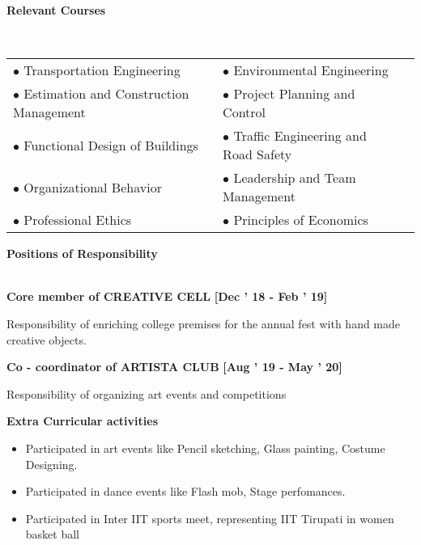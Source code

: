 \documentclass[a4paper,10pt]{article}
\begin{document}
\colorbox{titleColor}{\parbox{6.7in}{\textbf{Relevant Courses}}}\\[0.08in]
    \begin{tabular}{p{3.5in}p{3in}p{2.5in}}
\hspace{0.9pc}$\bullet$ Transportation Engineering&$\bullet$ Environmental Engineering\\[0.05in]
\hspace{0.9pc}$\bullet$ Estimation and Construction Management&$\bullet$ Project Planning and Control\\[0.05in]
\hspace{0.9pc}$\bullet$ Functional Design of Buildings&$\bullet$ Traffic Engineering and Road Safety\\[0.05in]
\hspace{0.9pc}$\bullet$ Organizational Behavior&$\bullet$ Leadership and Team Management\\[0.05in]
\hspace{0.9pc}$\bullet$ Professional Ethics&$\bullet$ Principles of Economics\\[0.05in]
\end{tabular}


\colorbox{titleColor}{\parbox{6.7in}{\textbf{Positions of Responsibility}}}\\

\textbf{Core member of CREATIVE CELL}  \hfill {\small{{\textbf{[Dec ’ 18 - Feb ’ 19]}}}\/} 
\begin{itemize*} 

        \item Responsibility of enriching college premises for the annual fest with hand made creative objects. 

        \end{itemize*}

\textbf{Co - coordinator of ARTISTA CLUB}  \hfill {\small{{\textbf{[Aug ’ 19 - May ’ 20]}}}\/} 
\begin{itemize*} 

        \item Responsibility of organizing art events and competitions 

        \end{itemize*}

\colorbox{titleColor}{\parbox{6.7in}{\textbf{Extra Curricular activities}}}

\begin{itemize}

    \setlength{\itemsep}{1pt}
\item Participated in art events like Pencil sketching, Glass painting, Costume Designing. \hfill 
\item Participated in dance events like Flash mob, Stage perfomances. \hfill 
\item Participated in Inter IIT sports meet, representing IIT Tirupati in women basket ball \hfill 
\end{itemize}
\end{document}
